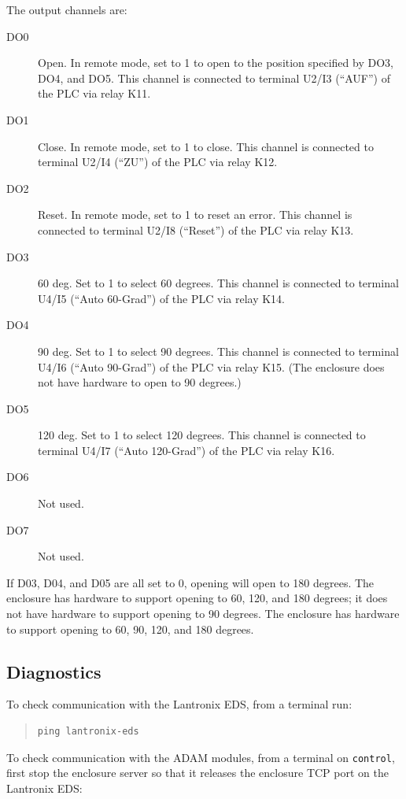 The output channels are:
\begin{description}
\item[DO0] Open. In remote mode, set to 1 to open to the position specified by DO3, DO4, and DO5. This channel is connected to terminal U2/I3 (“AUF”) of the PLC via relay K11.
\item[DO1] Close. In remote mode, set to 1 to close. This channel is connected to terminal U2/I4 (“ZU”) of the PLC via relay K12.
\item[DO2] Reset. In remote mode, set to 1 to reset an error. This channel is connected to terminal U2/I8 (“Reset”) of the PLC via relay K13.
\item[DO3] 60 deg. Set to 1 to select 60 degrees. This channel is connected to terminal U4/I5 (“Auto 60-Grad”) of the PLC via relay K14.
\item[DO4] 90 deg. Set to 1 to select 90 degrees. This channel is connected to terminal U4/I6 (“Auto 90-Grad”) of the PLC via relay K15. 
\ifcoatlioan
(The {\projectname} enclosure does not have hardware to open to 90 degrees.)
\fi
\item[DO5] 120 deg. Set to 1 to select 120 degrees. This channel is connected to terminal U4/I7 (“Auto 120-Grad”) of the PLC via relay K16.
\item[DO6] Not used.
\item[DO7] Not used.
\end{description}

If D03, D04, and D05 are all set to 0, opening will open to 180 degrees. 
\ifcoatlioan
The {\projectname} enclosure has hardware to support opening to 60, 120, and 180 degrees; it does not have hardware to support opening to 90 degrees. 
\fi
\ifddotioan
The {\projectname} enclosure has hardware to support opening to 60, 90, 120, and 180 degrees.
\fi

\subsection{Diagnostics}

To check communication with the Lantronix EDS, from a terminal run:

\begin{quotation}
\begin{verbatim}
ping lantronix-eds
\end{verbatim}
\end{quotation}

To check communication with the ADAM modules, from a terminal on \verb|control|, first stop the enclosure server so that it releases the enclosure TCP port on the Lantronix EDS:

